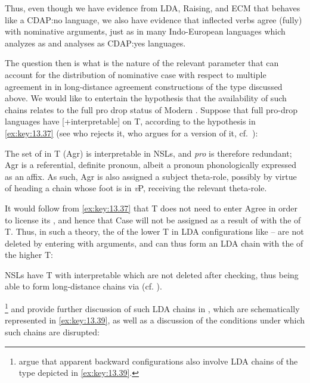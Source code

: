 \documentclass[output=paper]{langsci/langscibook}
\begin{document}
\begin{exe}
Thus, even though we have evidence from \gls{LDA}, Raising, and
\gls{ECM} that  behaves like a \gls{CDAP}:no
language, we also have evidence that inflected verbs agree (fully) with
nominative arguments, just as in many Indo-European
languages which \citet{Baker2015} analyzes as  and \citet{Baker2008}
analyses as \gls{CDAP}:yes languages.

The question then is what is the nature of the relevant parameter that can
account for the distribution of nominative case with respect to multiple
agreement in  in long-distance agreement constructions of the type
discussed above. We would like to entertain the hypothesis that the
availability of such chains relates to the full pro drop status of Modern
. Suppose that full pro-drop languages have [+interpretable]
 on T, according to the hypothesis in \eqref{ex:key:13.37} (see
\citealt{Holmberg2005} who rejects it, \citealt{Barbosa2009} who argues for a
version of it, cf.\ \citealt{AleAna1998}):

\ea%
    \label{ex:key:13.37}
    The set of  in T (Agr) is interpretable in \glspl{NSL}, and
    \emph{pro} is therefore redundant; Agr is a referential, definite pronoun,
    albeit a pronoun phonologically expressed as an affix. As such, Agr is also
    assigned a subject theta-role, possibly by virtue of heading a chain whose
    foot is in \emph{v}P,   receiving the relevant theta-role.
\z

It would follow from \eqref{ex:key:13.37} that T does not need to enter Agree
in order to license its , and hence that \Nom{} Case will not be
assigned as a result of  with the  of T. Thus, in such a
theory, the  of the lower T in \gls{LDA} configurations like
-- are not deleted by entering  with
\Nom{} arguments, and can thus form an \gls{LDA} chain with the  of
the higher T:

\ea%
    \label{ex:key:13.38}
    \glspl{NSL} have T with interpretable  which are not
    deleted after checking, thus being able to form long-distance chains via
     (cf.  \citealt{Ura1994}).
\z

\textcite{TsaAnaAle2017,TsaAleAna2019}\footnote{\citeauthor{TsaAnaAle2017}
argue that apparent backward  configurations also involve \gls{LDA}
chains of the type depicted in \eqref{ex:key:13.39}.} and \citet{AleAna2019} provide
further discussion of such \gls{LDA} chains in , which are schematically
represented in \eqref{ex:key:13.39}, as well as a discussion of the conditions under
which such chains are disrupted:


\end{exe}
\end{document}
